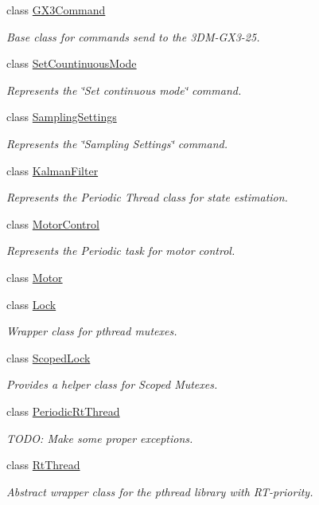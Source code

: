 \begin{DoxyCompactItemize}
class \hyperlink{class_u_s_u_1_1_g_x3_command}{\-G\-X3\-Command}
\begin{DoxyCompactList}\small\item\em \-Base class for commands send to the 3\-D\-M-\/\-G\-X3-\/25. \end{DoxyCompactList}\item 
class \hyperlink{class_u_s_u_1_1_set_countinuous_mode}{\-Set\-Countinuous\-Mode}
\begin{DoxyCompactList}\small\item\em \-Represents the \char`\"{}\-Set continuous mode\char`\"{} command. \end{DoxyCompactList}\item 
class \hyperlink{class_u_s_u_1_1_sampling_settings}{\-Sampling\-Settings}
\begin{DoxyCompactList}\small\item\em \-Represents the \char`\"{}\-Sampling Settings\char`\"{} command. \end{DoxyCompactList}\item 
class \hyperlink{class_u_s_u_1_1_kalman_filter}{\-Kalman\-Filter}
\begin{DoxyCompactList}\small\item\em \-Represents the \-Periodic \-Thread class for state estimation. \end{DoxyCompactList}\item 
class \hyperlink{class_u_s_u_1_1_motor_control}{\-Motor\-Control}
\begin{DoxyCompactList}\small\item\em \-Represents the \-Periodic task for motor control. \end{DoxyCompactList}\item 
class \hyperlink{class_u_s_u_1_1_motor}{\-Motor}
\item 
class \hyperlink{class_u_s_u_1_1_lock}{\-Lock}
\begin{DoxyCompactList}\small\item\em \-Wrapper class for pthread mutexes. \end{DoxyCompactList}\item 
class \hyperlink{class_u_s_u_1_1_scoped_lock}{\-Scoped\-Lock}
\begin{DoxyCompactList}\small\item\em \-Provides a helper class for \-Scoped \-Mutexes. \end{DoxyCompactList}\item 
class \hyperlink{class_u_s_u_1_1_periodic_rt_thread}{\-Periodic\-Rt\-Thread}
\begin{DoxyCompactList}\small\item\em \-T\-O\-D\-O\-: \-Make some proper exceptions. \end{DoxyCompactList}\item 
class \hyperlink{class_u_s_u_1_1_rt_thread}{\-Rt\-Thread}
\begin{DoxyCompactList}\small\item\em \-Abstract wrapper class for the pthread library with \-R\-T-\/priority. \end{DoxyCompactList}\end{DoxyCompactItemize}
